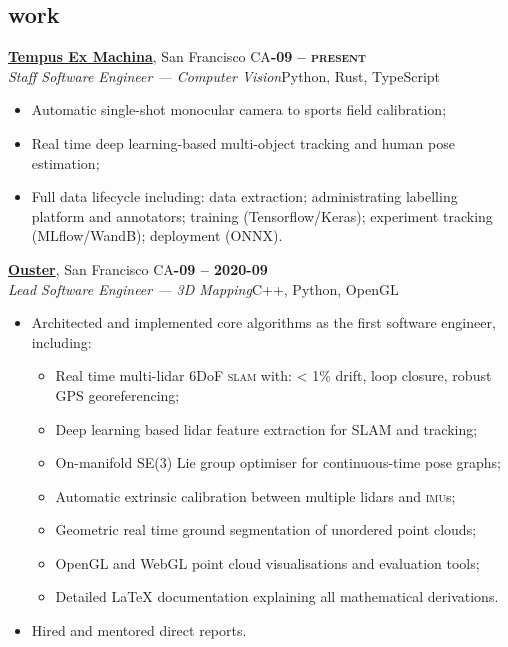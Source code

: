 \documentclass[margin,10pt]{res}
\begin{document}
\begin{resume}
\section{\sc \lsstyle work}
    \href{https://tempus-ex.com}{\textbf{Tempus Ex Machina}}, San Francisco CA\hfill \textsc{\bfseries{}-09 -- present}\\
    \textit{Staff Software Engineer --- Computer Vision}\hfill Python, Rust, TypeScript
    \vspace{0.5em}
    \begin{itemize}
        \item Automatic single-shot monocular camera to sports field calibration;
        \item Real time deep learning-based multi-object tracking and human pose estimation;
        \item Full data lifecycle including: data extraction; administrating labelling platform and annotators; training (Tensorflow/Keras); experiment tracking (MLflow/WandB); deployment (ONNX).
    \end{itemize}

    \href{https://ouster.io}{\textbf{Ouster}}, San Francisco CA\hfill \textsc{\bfseries{}-09 -- 2020-09}\\
    \textit{Lead Software Engineer --- 3D Mapping}\hfill C++, Python, OpenGL
    \vspace{0.5em}
    \begin{itemize}
        \item Architected and implemented core algorithms as the first software engineer, including:
        \begin{itemize}
            \item Real time multi-lidar 6DoF \textsc{slam} with: < 1\% drift, loop closure, robust GPS georeferencing;
            \item Deep learning based lidar feature extraction for SLAM and tracking;
            \item On-manifold SE(3) Lie group optimiser for continuous-time pose graphs;
            \item Automatic extrinsic calibration between multiple lidars and \textsc{imu}s;
            \item Geometric real time ground segmentation of unordered point clouds;
            \item OpenGL and WebGL point cloud visualisations and evaluation tools;
            \item Detailed LaTeX documentation explaining all mathematical derivations.
        \end{itemize}
        \item Hired and mentored direct reports.
    \end{itemize}

\end{resume}
\end{document}
